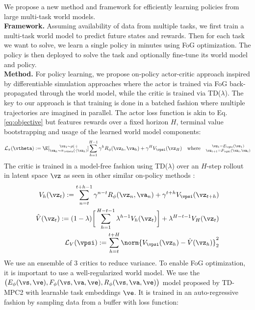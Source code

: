 \documentclass{article} %
\begin{document}
We propose a new method and framework for efficiently learning policies from large multi-task world models.\\ \textbf{Framework.} Assuming availability of data from multiple tasks, we first train a multi-task world model to predict future states and rewards. Then for each task we want to solve, we learn a single policy in minutes using FoG optimization. The policy is then deployed to solve the task and optionally fine-tune its world model and policy.
\\\textbf{Method.} For policy learning, we propose on-policy actor-critic approach inspired by differentiable simulation approaches \citet{xu2022accelerated} where the actor is trained via FoG back-propagated through the world model, while the critic is trained via TD($\lambda$). The key to our approach is that training is done in a batched fashion where multiple trajectories are imagined in parallel. The actor loss function is akin to Eq. \ref{eq:objective} but features rewards over a fixed horizon $H$, terminal value bootstrapping and usage of the learned world model components: 
\begin{align}
    \label{eq:actor-objectice}
    \mathcal{L}_\pi(\vtheta) := \E[\substack{\vs_1 \sim \rho(\cdot) \\ \va_h \sim \pi_\vtheta(\cdot | \vz_h)}]{ \sum_{h=1}^{H-1} \gamma^h R_\phi(\vz_h, \va_h) + \gamma^H V_\vpsi (\vz_H) } \quad \text{where} \quad \substack{\vz_1 = E_\vphi(\vs_1)  \\ \vz_{t+1} = F_\vphi (\vz_t, \va_t)}
\end{align}
The critic is trained in a model-free fashion using TD($\lambda$) over an $H$-step rollout in latent space $\vz$ as seen in other similar on-policy methods \citet{sutton2018reinforcement,hafner2019dream,xu2022accelerated}:
\begin{align}
    V_h(\vz_t) := \sum_{n=t}^{t+h-1} \gamma^{n-t} R_\phi(\vz_n, \va_n) + \gamma^{t+h} V_\vpsi (\vz_{t+h}) \label{eq:td-1}\\
    \hat{V}(\vz_t) := (1-\lambda) \bigg[ \sum_{h=1}^{H-t-1} \lambda^{h-1} V_h(\vz_t) \bigg] + \lambda^{H-t-1} V_H(\vz_t) \\
    \mathcal{L}_V(\vpsi) := \sum_{h=t}^{t+H} \norm{V_\vpsi(\vz_h) - \hat{V}(\vz_h)}_2^2 \label{eq:td-3}
\end{align}
We use an ensemble of 3 critics to reduce variance. To enable FoG optimization, it is important to use a well-regularized world model. We use the $\big( E_\phi(\vs, \ve), F_\phi(\vs, \va, \ve), R_\phi(\vs, \va, \ve) \big)$ model proposed by TD-MPC2 \citet{hansen2023td} with learnable task embeddings $\ve$. It is trained in an auto-regressive fashion by sampling data from a buffer with loss function:
\end{document}

